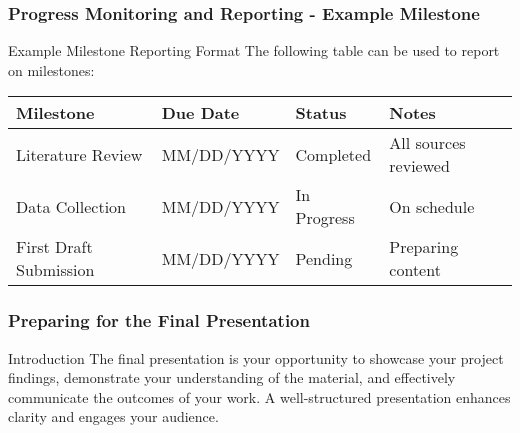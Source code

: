 \documentclass[aspectratio=169]{beamer}
\begin{document}
\begin{frame}[fragile]
    \frametitle{Progress Monitoring and Reporting - Example Milestone}
    \begin{block}{Example Milestone Reporting Format}
        The following table can be used to report on milestones:
    \end{block}
    \begin{table}[h]
        \centering
        \begin{tabular}{|l|l|l|l|}
            \hline
            \textbf{Milestone} & \textbf{Due Date} & \textbf{Status} & \textbf{Notes} \\ \hline
            Literature Review   & MM/DD/YYYY  & Completed & All sources reviewed \\ \hline
            Data Collection     & MM/DD/YYYY  & In Progress & On schedule \\ \hline
            First Draft Submission & MM/DD/YYYY & Pending & Preparing content \\ \hline
        \end{tabular}
    \end{table}
\end{frame}

\begin{frame}[fragile]
    \frametitle{Preparing for the Final Presentation}
    \begin{block}{Introduction}
        The final presentation is your opportunity to showcase your project findings, 
        demonstrate your understanding of the material, and effectively communicate 
        the outcomes of your work. A well-structured presentation enhances clarity 
        and engages your audience.
    \end{block}
\end{frame}
\end{document}
